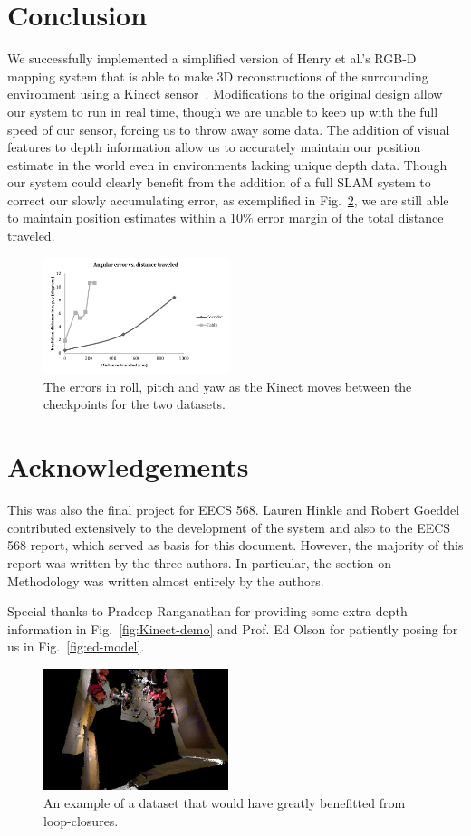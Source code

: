 \documentclass[letterpaper, 10pt, conference]{ieeeconf}
\begin{document}
\section{Conclusion}
We successfully implemented a simplified version of Henry et al.'s RGB-D mapping
system that is able to make 3D reconstructions of the surrounding environment
using a Kinect sensor~\cite{Henry2010RGBd}. Modifications to the original
design allow our system to run in real time, though we are unable to keep up with
the full speed of our sensor, forcing us to throw away some data. The addition of
visual features to depth information allow us to accurately maintain our position
estimate in the world even in environments lacking unique depth data. Though our
system could clearly benefit from the addition of a full SLAM system to
correct our slowly accumulating error, as exemplified in Fig.~\ref{fig:slam},
 we are still able to maintain position
estimates within a 10\% error margin of the total distance traveled.

\begin{figure}[t]
\centering
\includegraphics[width=0.48\textwidth]{figures/gt_angular.pdf}
\caption{The errors in roll, pitch and yaw as the Kinect moves between the checkpoints
for the two datasets.}
\label{fig:plot-angular}
\end{figure}

\section*{Acknowledgements}
This was also the final project for EECS 568. Lauren Hinkle and Robert Goeddel
contributed extensively to the development of the system
and also to the EECS 568 report, which served as basis for this document. However,
the majority of this report was written by the three authors. In particular, the
section on Methodology was written almost entirely by the authors.

Special thanks to Pradeep Ranganathan for providing some extra depth
information in Fig.~\ref{fig:Kinect-demo} and Prof. Ed Olson for patiently
posing for us in Fig.~\ref{fig:ed-model}.





\begin{figure}[t]
\centering
\includegraphics[width=0.48\textwidth]{figures/slam.png}
\caption{An example of a dataset that would have greatly benefitted from loop-closures.}
\label{fig:slam}
\end{figure}
\end{document}
